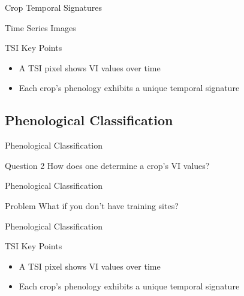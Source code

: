 \documentclass[  compress,xcolor={usenames,dvipsnames}]{beamer}
\begin{document}
\begin{frame}{Crop Temporal Signatures}
\begin{figure}
  \centering
\end{figure}
\end{frame}

\begin{frame}{Time Series Images}
\begin{block}{TSI Key Points}
\begin{itemize}
  \item A TSI pixel shows VI values over time
  \item Each crop's phenology exhibits a unique temporal signature
\end{itemize}
\end{block}
\end{frame}

\subsection{Phenological Classification}
\begin{frame}{Phenological Classification}
\begingroup
{}
\begin{block}{Question 2}
  How does one determine a crop's VI values?
\end{block}
\endgroup
{}
\end{frame}

\begin{frame}{Phenological Classification}
\begin{alertblock}{Problem}
  What if you don’t have training sites?
\end{alertblock}
\end{frame}

\begin{frame}{Phenological Classification}
\begin{block}{TSI Key Points}
\begin{itemize}
  \item A TSI pixel shows VI values over time
  \item Each crop's phenology exhibits a unique temporal signature
\end{itemize}
\end{block}
\vspace{\baselineskip}
\centering
{}
\end{frame}
\end{document}

